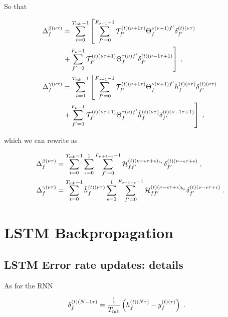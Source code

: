 \begin{subappendices}
So that

\begin{align}
\Delta^{\beta(\nu \tau)}_{f}&=\sum_{t=0}^{T_{{\rm mb}}-1}\left[\sum_{f'=0}^{F_{\nu+1}-1}
%
\mathcal{T}^{(t)(\nu+1\tau)}_{f'}\Theta^{\nu(\nu+1)f'}_{f}\delta^{(t)(\nu\tau)}_{f'}\right.\notag\\
%
&\left.+\sum_{f'=0}^{F_{\nu}-1}
%
\mathcal{T}^{(t)(\nu\tau+1)}_{f'}\Theta^{\tau(\nu)f'}_{f}\delta^{(t)(\nu-1\tau+1)}_{f'}\right]\;,\\
%
\Delta^{\gamma(\nu \tau)}_{f}&=\sum_{t=0}^{T_{{\rm mb}}-1}\left[\sum_{f'=0}^{F_{\nu+1}-1}
%
\mathcal{T}^{(t)(\nu+1\tau)}_{f'}\Theta^{\nu(\nu+1)f'}_{f}
%
\tilde{h}^{(t)(\nu\tau)}_{f}\delta^{(t)(\nu\tau)}_{f'}\right.\notag\\
%
&\left.+\sum_{f'=0}^{F_{\nu}-1}\mathcal{T}^{(t)(\nu\tau+1)}_{f'}
%
\Theta^{\tau(\nu)f'}_{f}\tilde{h}^{(t)(\nu\tau)}_{f}\delta^{(t)(\nu-1\tau+1)}_{f'}\right]\;,
\end{align}

which we can rewrite as

\begin{align}
\Delta^{\beta(\nu \tau)}_{f}&=\sum_{t=0}^{T_{{\rm mb}}-1}\sum_{\epsilon=0}^{1}\sum_{f'=0}^{F_{\nu+1-\epsilon}-1}
%
\mathcal{H}^{(t)(\nu-\epsilon\tau+\epsilon)_{b_\epsilon}}_{ff'}\delta^{(t)(\nu-\epsilon\tau+\epsilon)}_{f'}\;,\\
%
\Delta^{\gamma(\nu \tau)}_{f}&=\sum_{t=0}^{T_{{\rm mb}}-1}\tilde{h}^{(t)(\nu\tau)}_{f}\sum_{\epsilon=0}^{1}\sum_{f'=0}^{F_{\nu+1-\epsilon}-1}
%
\mathcal{H}^{(t)(\nu-\epsilon\tau+\epsilon)_{b_\epsilon}}_{ff'}\delta^{(t)(\nu-\epsilon\tau+\epsilon)}_{f'}\;.
\end{align}

\section{LSTM Backpropagation}




\subsection{LSTM Error rate updates: details} \label{sec:ARNNLSTMerror_rates}

As for the RNN 

\begin{align}
\delta^{(t)(N-1\tau)}_{f}&
%
=\frac{1}{T_{{\rm mb}}}\left(h^{(t)(N\tau)}_{f}-y^{(t)(\tau)}_{f}\right)\;.
\end{align}


\end{subappendices}
